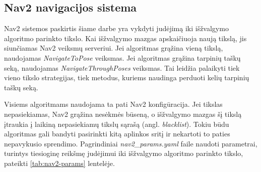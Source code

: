 \documentclass[]{VUMIFTemplateClass}
\begin{document}
\subsection{Nav2 navigacijos sistema}

Nav2 sistemos paskirtis šiame darbe yra vykdyti judėjimą iki išžvalgymo algoritmo parinkto tikslo. Kai išžvalgymo mazgas apskaičiuoja naują tikslą, jis
siunčiamas Nav2 veiksmų serveriui. Jei algoritmas grąžina vieną tikslą, naudojamas \textit{NavigateToPose} veiksmas. Jei algoritmas grąžina tarpinių taškų
seką, naudojamas \textit{NavigateThroughPoses} veiksmas. Tai leidžia palaikyti tiek vieno tikslo strategijas, tiek metodus, kuriems naudinga perduoti kelių
tarpinių taškų seką.

Visiems algoritmams naudojama ta pati Nav2 konfigūracija. Jei tikslas nepasiekiamas, Nav2 grąžina nesėkmės būseną, o išžvalgymo mazgas šį tikslą įtraukia į laikiną
nepasiekiamų tikslų sąrašą (angl. \textit{blacklist}). Tokiu būdu algoritmas gali bandyti pasirinkti kitą aplinkos sritį ir nekartoti to paties nepavykusio sprendimo.
Pagrindiniai \textit{nav2\_params.yaml} faile naudoti parametrai, turintys tiesioginę reikšmę judėjimui iki išžvalgymo algoritmo parinkto tikslo, pateikti
\ref{tab:nav2-params} lentelėje.
\end{document}
